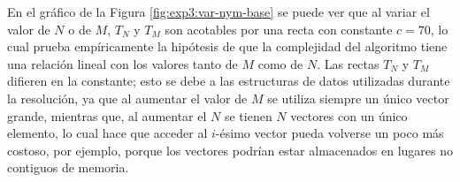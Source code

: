 	En el gráfico de la Figura \ref{fig:exp3:var-nym-base} se puede ver que al
	variar el valor de $N$ o de $M$, $T_N$ y $T_M$ son acotables por una recta
	con constante $c = 70$, lo cual prueba empíricamente la hipótesis de que la
	complejidad del algoritmo tiene una relación lineal con los valores tanto de
	$M$ como de $N$. Las rectas $T_N$ y $T_M$ difieren en la constante; esto se
	debe a las estructuras de datos utilizadas durante la resolución, ya que al
	aumentar el valor de $M$ se utiliza siempre un único vector grande, mientras
	que, al aumentar el $N$ se tienen $N$ vectores con un único elemento, lo
	cual hace que acceder al $i$-ésimo vector pueda volverse un poco más
	costoso, por ejemplo, porque los vectores podrían estar almacenados en
	lugares no contiguos de memoria.

    \begin{figure}[H]
        \centering
        \caption{}
        \label{fig:exp3:var-nym-divconst}
    \end{figure}

